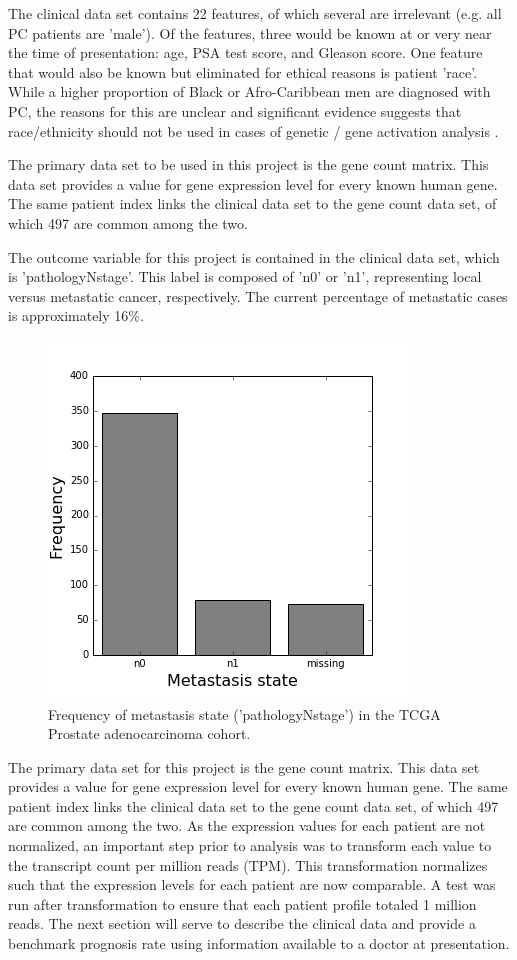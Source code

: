 \documentclass[final]{article}
\begin{document}
The clinical data set contains 22 features, of which several are irrelevant
(e.g. all PC patients are 'male').  Of the features, three would be
known at or very near the time of presentation: age, PSA test score, and Gleason
score.  One feature that would also be known but eliminated for ethical reasons is
patient 'race'.  While a higher proportion of Black or Afro-Caribbean men are
diagnosed with PC, the reasons for this are unclear and significant evidence suggests that
race/ethnicity should not be used in cases of genetic / gene activation analysis \cite{Yudel16}.

The primary data set to be used in this project is the gene count matrix.  This
data set provides a value for gene expression level for every known human gene.
The same patient index links the clinical data set to the  gene count data set,
of which 497 are common among the two.

The outcome variable for this project is contained in the clinical data set,
which is 'pathologyNstage'.  This label is composed of 'n0' or 'n1',
representing local versus metastatic cancer, respectively.  The current
percentage of metastatic cases is approximately 16\%.

\begin{figure}
	\centering
	\caption{Frequency of metastasis state ('pathologyNstage') in the TCGA Prostate adenocarcinoma cohort.\label{MetFreq}}
	\includegraphics[scale=0.5]{LabelCount}
\end{figure}


The primary data set for this project is the gene count matrix.  This data set
provides a value for gene expression level for every known human gene.  The same
patient index links the clinical data set to the  gene count data set, of which
497 are common among the two.  As the expression values for each patient are not
normalized, an important step prior to analysis was to transform each value to
the transcript count per million reads (TPM).  This transformation normalizes
such that the expression levels for each patient are now comparable.  A test was
run after transformation to ensure that each patient profile totaled 1 million
reads.  The next section will serve to describe the clinical data and provide a
benchmark prognosis rate using information available to a doctor at
presentation.
\end{document}
